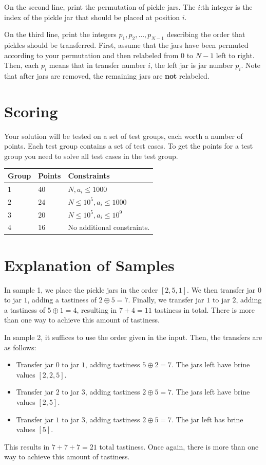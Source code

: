On the second line, print the permutation of pickle jars. The $i$:th integer is the index of the pickle jar that should
be placed at position $i$.

On the third line, print the integers $p_1, p_2, \dots, p_{N-1}$ describing the order that pickles
should be transferred. First, assume that the jars have been permuted according to your permutation
and then relabeled from $0$ to $N-1$ left to right. Then, each $p_i$ means that in transfer number
$i$, the left jar is jar number $p_i$. Note that after jars are removed, the remaining jars are
\textbf{not} relabeled.


\section*{Scoring}
Your solution will be tested on a set of test groups, each worth a number of points. Each test group contains
a set of test cases. To get the points for a test group you need to solve all test cases in the test group.

\noindent
\begin{tabular}{| l | l | p{12cm} |}
  \hline
  \textbf{Group} & \textbf{Points} & \textbf{Constraints} \\ \hline
  $1$    & $40$        & $N, a_i \leq 1000$ \\ \hline
  $2$    & $24$        & $N \leq 10^5, a_i \leq 1000$ \\ \hline
  $3$    & $20$        & $N \leq 10^5, a_i \leq 10^9$ \\ \hline
  $4$    & $16$        & No additional constraints. \\ \hline 
\end{tabular}

\section*{Explanation of Samples}
In sample 1, we place the pickle jars in the order $[2,5,1]$. We then transfer jar $0$ to jar $1$, adding a tastiness
of $2 \oplus 5=7$. Finally, we transfer jar $1$ to jar $2$, adding a tastiness of $5 \oplus 1=4$, resulting in $7+4=11$
tastiness in total. There is more than one way to achieve this amount of tastiness.

In sample 2, it suffices to use the order given in the input. Then, the transfers are as follows:
\begin{itemize}
  \item Transfer jar $0$ to jar $1$, adding tastiness $5 \oplus 2=7$. The jars left have brine values $[2,2,5]$.
  \item Transfer jar $2$ to jar $3$, adding tastiness $2 \oplus 5=7$. The jars left have brine values $[2,5]$.
  \item Transfer jar $1$ to jar $3$, adding tastiness $2 \oplus 5=7$. The jar left has brine values $[5]$.
\end{itemize}
This results in $7+7+7=21$ total tastiness. Once again, there is more than one way to achieve this amount of tastiness.
